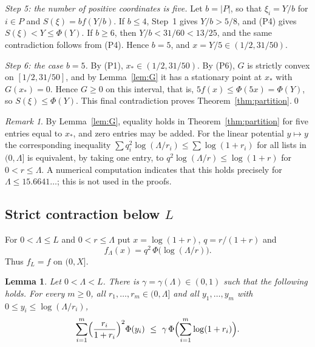 \documentclass{amsart}
\numberwithin{equation}{section}
\numberwithin{table}{section}
\newtheorem{lemma}[theorem]{Lemma}
\theoremstyle{definition}
\theoremstyle{remark}
\newtheorem{remark}[theorem]{Remark}
\newcommand{\xs}{x_{\ast}}
\begin{document}
\emph{Step 5: the number of positive coordinates is five.} Let $b=|P|$, so that $\xi_i=Y/b$ for $i\in P$ and $S(\xi)=bf(Y/b)$. If $b\le4$, Step~1 gives $Y/b>5/8$, and (P4) gives $S(\xi)<Y\le\Phi(Y)$. If $b\ge6$, then $Y/b<31/60<13/25$, and the same contradiction follows from (P4). Hence $b=5$, and $x=Y/5\in(1/2,31/50)$.

\emph{Step 6: the case $b=5$.} By (P1), $\xs\in(1/2,31/50)$. By (P6), $G$ is strictly convex on $[1/2,31/50]$, and by Lemma~\ref{lem:G} it has a stationary point at $\xs$ with $G(\xs)=0$. Hence $G\ge0$ on this interval, that is, $5f(x)\le\Phi(5x)=\Phi(Y)$, so $S(\xi)\le\Phi(Y)$. This final contradiction proves Theorem~\ref{thm:partition}.\qed

\begin{remark}\label{rem:linear}
By Lemma~\ref{lem:G}, equality holds in Theorem~\ref{thm:partition} for five entries equal to $\xs$, and zero entries may be added. For the linear potential $y\mapsto y$ the corresponding inequality $\sum q_i^2\log(\Lambda/r_i)\le\sum\log(1+r_i)$ for all lists in $(0,\Lambda]$ is equivalent, by taking one entry, to $q^2\log(\Lambda/r)\le\log(1+r)$ for $0<r\le\Lambda$. A numerical computation indicates that this holds precisely for $\Lambda\le15.6641\ldots$; this is not used in the proofs.
\end{remark}

\subsection{\texorpdfstring{Strict contraction below $L$}{Strict contraction below L}}
For $0<\Lambda\le L$ and $0<r\le\Lambda$ put $x=\log(1+r)$, $q=r/(1+r)$ and
\[
f_\Lambda(x)=q^2\,\Phi\bigl(\log(\Lambda/r)\bigr).
\]
Thus $f_L=f$ on $(0,X]$.

\begin{lemma}\label{lem:contraction}
Let $0<\Lambda<L$. There is $\gamma=\gamma(\Lambda)\in(0,1)$ such that the following holds. For every $m\ge0$, all $r_1,\dots,r_m\in(0,\Lambda]$ and all $y_1,\dots,y_m$ with $0\le y_i\le\log(\Lambda/r_i)$,
\[
\sum_{i=1}^m\Bigl(\frac{r_i}{1+r_i}\Bigr)^2\Phi(y_i)\ \le\ \gamma\,\Phi\Bigl(\sum_{i=1}^m\log(1+r_i)\Bigr).
\]
\end{lemma}
\end{document}
